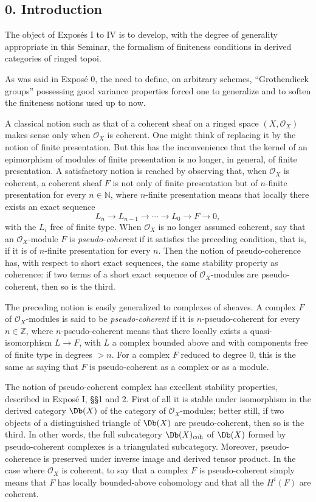 \documentclass[11pt]{article}
\begin{document}
\subsection*{0. Introduction}
The object of Exposés I to IV is to develop, with the degree of generality appropriate in this Seminar, the formalism of finiteness conditions in derived categories of ringed topoi.

As was said in Exposé 0, the need to define, on arbitrary schemes, ``Grothendieck groups'' possessing good variance properties forced one to generalize and to soften the finiteness notions used up to now.

A classical notion such as that of a coherent sheaf on a ringed space \((X,\mathcal O_X)\) makes sense only when \(\mathcal O_X\) is coherent. One might think of replacing it by the notion of finite presentation. But this has the inconvenience that the kernel of an epimorphism of modules of finite presentation is no longer, in general, of finite presentation. A satisfactory notion is reached by observing that, when \(\mathcal O_X\) is coherent, a coherent sheaf \(F\) is not only of finite presentation but of \(n\)-finite presentation for every \(n\in\mathbb N\), where \(n\)-finite presentation means that locally there exists an exact sequence
\[
  L_n\longrightarrow L_{n-1}\longrightarrow \cdots \longrightarrow L_0\longrightarrow F\longrightarrow 0,
\]
with the \(L_i\) free of finite type. When \(\mathcal O_X\) is no longer assumed coherent, say that an \(\mathcal O_X\)-module \(F\) is \emph{pseudo-coherent} if it satisfies the preceding condition, that is, if it is of \(n\)-finite presentation for every \(n\). Then the notion of pseudo-coherence has, with respect to short exact sequences, the same stability property as coherence: if two terms of a short exact sequence of \(\mathcal O_X\)-modules are pseudo-coherent, then so is the third.

The preceding notion is easily generalized to complexes of sheaves. A complex \(F\) of \(\mathcal O_X\)-modules is said to be \emph{pseudo-coherent} if it is \(n\)-pseudo-coherent for every \(n\in\mathbb Z\), where \(n\)-pseudo-coherent means that there locally exists a quasi-isomorphism \(L\to F\), with \(L\) a complex bounded above and with components free of finite type in degrees \(>n\). For a complex \(F\) reduced to degree \(0\), this is the same as saying that \(F\) is pseudo-coherent as a complex or as a module.

The notion of pseudo-coherent complex has excellent stability properties, described in Exposé I, §§1 and 2. First of all it is stable under isomorphism in the derived category \(\Db(X)\) of the category of \(\mathcal O_X\)-modules; better still, if two objects of a distinguished triangle of \(\Db(X)\) are pseudo-coherent, then so is the third. In other words, the full subcategory \(\Db(X)_{\mathrm{coh}}\) of \(\Db(X)\) formed by pseudo-coherent complexes is a triangulated subcategory. Moreover, pseudo-coherence is preserved under inverse image and derived tensor product. In the case where \(\mathcal O_X\) is coherent, to say that a complex \(F\) is pseudo-coherent simply means that \(F\) has locally bounded-above cohomology and that all the \(H^i(F)\) are coherent.
\end{document}
